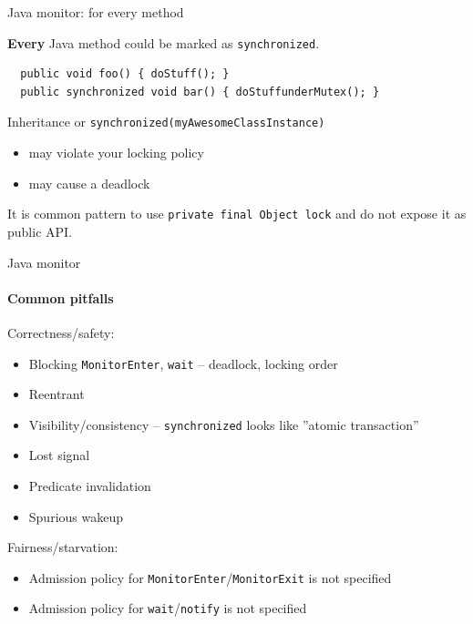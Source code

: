 
\begin{frame}[t,fragile]{Java monitor: for every method}

\textbf{Every} Java method could be marked as \texttt{synchronized}.
\begin{verbatim}
  public void foo() { doStuff(); }
  public synchronized void bar() { doStuffunderMutex(); }
\end{verbatim}

Inheritance or \texttt{synchronized(myAwesomeClassInstance)}
\begin{itemize}
    \item may violate your locking policy 
    \item may cause a deadlock    
\end{itemize}

It is common pattern to use \texttt{private final Object lock} and do not expose it as public API.
\end{frame}


\begin{frame}[t,noframenumbering]{Java monitor}
\framesubtitle{Common pitfalls}

Correctness/safety:
\begin{itemize}
    \item Blocking \texttt{MonitorEnter}, \texttt{wait} -- deadlock, locking order
    \item Reentrant
    \item Visibility/consistency -- \texttt{synchronized} looks like ''atomic transaction''
    \item Lost signal
    \item Predicate invalidation
    \item Spurious wakeup
\end{itemize}

Fairness/starvation:
\begin{itemize}
    \item Admission policy for \texttt{MonitorEnter}/\texttt{MonitorExit} is not specified
    \item Admission policy for \texttt{wait}/\texttt{notify} is not specified
\end{itemize}
\end{frame}


